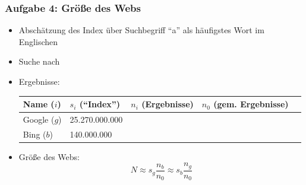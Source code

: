 \documentclass[accentcolor=tud7b,noresetcounter]{tudbeamer}
\begin{document}
  \begin{frame}
  	\frametitle{Aufgabe 4: Größe des Webs}
  	\begin{itemize}
  	 \item Abschätzung des Index über Suchbegriff "`a"' als häufigstes Wort im Englischen
  	 \item Suche nach
  	 \item Ergebnisse:\\
  	 \begin{tabular}{|l|l|r|l|l|}
	  \hline
	  \textbf{Name ($i$)} & \textbf{$s_i$ ("`Index"')} & \textbf{$n_i$ (Ergebnisse)} & \textbf{$n_0$ (gem. Ergebnisse)}\\
	  \hline
	  Google ($g$) & 25.270.000.000 & & \\
	  \hline
	  Bing ($b$)  & 140.000.000 & & \\
	  \hline
  	\end{tabular}
  	\item Größe des Webs:
  	$$N \approx s_g \frac{n_b}{n_0} \approx s_b \frac{n_g}{n_0}$$
  	\end{itemize}

  	


  \end{frame}
  
  
    

\end{document}
